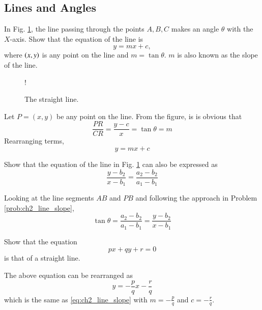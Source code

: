 \subsection{Lines and Angles}
\begin{problem}
\label{prob:ch2_line_slope}
In Fig. \ref{fig:ch2_line}, the line passing through the points $A,B,C$ makes an angle $\theta$ with the $X$-axis.  Show that the equation of the line is
\begin{equation}
y = mx + c,
\label{eq:ch2_line_slope}
\end{equation}
where $\left(x,y\right)$ is any point on the line and $m = \tan \theta$.  $m$ is also known as the slope of the line.
%
\end{problem}
%
\begin{figure}[!h]
\centering
\resizebox {\columnwidth} {!} {

}
\caption{The straight line.}
\label{fig:ch2_line}
\end{figure}
\proof Let $P = (x,y)$ be any point on the line. From the figure, is is obvious that
%
\begin{equation}
\frac{PR}{CR} = \frac{y-c}{x} = \tan \theta = m
\end{equation}
%
Rearranging terms,
\begin{equation}
y = mx + c
\end{equation}
%
\begin{problem}
Show that the equation of the line in Fig. \ref{fig:ch2_line} can also be expressed as
%
\begin{equation}
\label{eq:ch2_line_two_pt}
\frac{y-b_2}{x-b_1} = \frac{a_2-b_2}{a_1-b_1}
\end{equation}
%
\end{problem}
\proof Looking at the line segments $AB$ and $PB$ and following the approach in Problem \ref{prob:ch2_line_slope}, 
\begin{equation}
\tan \theta = \frac{a_2-b_2}{a_1-b_1} = \frac{y-b_2}{x - b_1}
\end{equation}
\begin{problem}
Show that the equation
\begin{equation}
px+qy + r = 0
\label{eq:ch2_line_ab}
\end{equation}
is that of a straight line.
\end{problem}
\proof The above equation can be rearranged as
%
\begin{equation}
y = -\frac{p}{q}x - \frac{r}{q}
\end{equation}
%
which is the same as \eqref{eq:ch2_line_slope} with $m = -\frac{p}{q}$ and $c = -\frac{r}{q}$.
